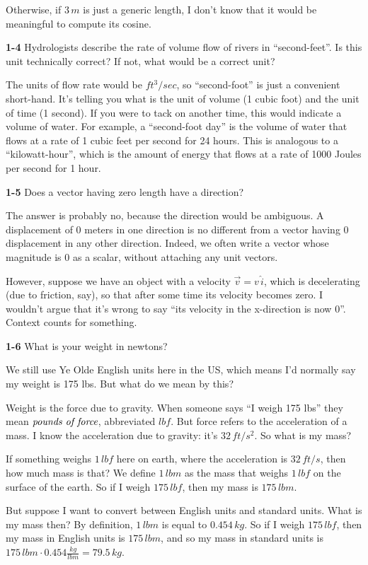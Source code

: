 \documentclass{amsart}
\begin{document}
Otherwise, if $3\, m$ is just a generic length, I don't know that it would be meaningful to compute its cosine.

\textbf{1-4} Hydrologists describe the rate of volume flow of rivers in ``second-feet''.
Is this unit technically correct?
If not, what would be a correct unit?

The units of flow rate would be $ft^{3}/sec$, so ``second-foot'' is just a convenient short-hand.
It's telling you what is the unit of volume (1 cubic foot) and the unit of time (1 second).
If you were to tack on another time, this would indicate a volume of water.
For example, a ``second-foot day'' is the volume of water that flows at a rate of 1 cubic feet per second for 24 hours.
This is analogous to a ``kilowatt-hour'', which is the amount of energy that flows at a rate of 1000 Joules per second for 1 hour.

\textbf{1-5} Does a vector having zero length have a direction?

The answer is probably no, because the direction would be ambiguous.
A displacement of 0 meters in one direction is no different from a vector having 0 displacement in any other direction.
Indeed, we often write a vector whose magnitude is 0 as a scalar, without attaching any unit vectors.

However, suppose we have an object with a velocity $\vec v = v \, \hat i$, which is decelerating (due to friction, say),
so that after some time its velocity becomes zero.
I wouldn't argue that it's wrong to say ``its velocity in the x-direction is now 0''.
Context counts for something.

\textbf{1-6} What is your weight in newtons?

We still use Ye Olde English units here in the US, which means I'd normally say my weight is 175 lbs.
But what do we mean by this?

Weight is the force due to gravity.
When someone says ``I weigh 175 lbs'' they mean $\emph{pounds of force}$, abbreviated $lbf$.
But force refers to the acceleration of a mass.  I know the acceleration due to gravity: it's $32 \, ft/s^{2}$.
So what is my mass?

If something weighs $1 \, lbf$ here on earth, where the acceleration is $32 \, ft/s$, then how much mass is that?
We define $1 \, lbm$ as the mass that weighs $1 \, lbf$ on the surface of the earth.
So if I weigh $175 \, lbf$, then my mass is $175 \, lbm$.

But suppose I want to convert between English units and standard units.
What is my mass then?
By definition, $1 \, lbm$ is equal to $0.454 \, kg$.
So if I weigh $175 \, lbf$, then my mass in English units is $175 \, lbm$,
and so my mass in standard units is $175 \, lbm \cdot 0.454 \frac{kg}{lbm} = 79.5 \, kg$.
\end{document}
